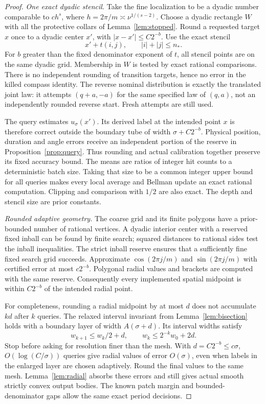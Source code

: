 \begin{proof}
\emph{One exact dyadic stencil.}
Take the fine localization to be a dyadic number comparable to $c h^s$,
where $h=2\pi/m\asymp\nu^{1/(s-2)}$. Choose a dyadic rectangle $W$
with all the protective collars of Lemma~\ref{lem:stopped}. Round a
requested target $x$ once to a dyadic center $x'$, with
$|x-x'|\le C2^{-b}$. Use the exact stencil
\[
                         x'+t(i,j),\qquad |i|+|j|\le n_*.
\]
For $b$ greater than the fixed denominator exponent of $t$, all stencil
points are on the same dyadic grid. Membership in $W$ is tested by
exact rational comparisons. There is no independent rounding of
transition targets, hence no error in the killed compass identity.
The reverse nominal distribution is exactly the translated joint law:
it attempts $(q+a,-a)$ for the same specified law of $(q,a)$, not an
independently rounded reverse start. Fresh attempts are still used.

The query estimates $u_\sigma(x')$. Its derived label at the intended
point $x$ is therefore correct outside the boundary tube of width
$\sigma+C2^{-b}$. Physical position, duration and angle errors receive
an independent portion of the reserve in
Proposition~\ref{prop:query}. Thus rounding and actual calibration
together preserve its fixed accuracy bound. The means are ratios of
integer hit counts to a deterministic batch size. Taking that size to
be a common integer upper bound for all queries makes every local
average and Bellman update an exact rational computation. Clipping and
comparison with $1/2$ are also exact. The depth and stencil size are
prior constants.

\emph{Rounded adaptive geometry.}
The coarse grid and its finite polygons have a prior-bounded number
of rational vertices. A dyadic interior center with a reserved fixed
inball can be found by finite search; squared distances to rational
sides test the inball inequalities. The strict inball reserve ensures
that a sufficiently fine fixed search grid succeeds. Approximate
$\cos(2\pi j/m)$ and $\sin(2\pi j/m)$ with certified error at most
$c2^{-b}$. Polygonal radial values and brackets are computed with the
same reserve. Consequently every implemented spatial midpoint is
within $C2^{-b}$ of the intended radial point.

For completeness, rounding a radial midpoint by at most $d$ does not
accumulate $kd$ after $k$ queries. The relaxed interval invariant from
Lemma~\ref{lem:bisection} holds with a boundary layer of width
$A(\sigma+d)$. Its interval widths satisfy
\[
                     w_{k+1}\le w_k/2+d,
 \qquad w_k\le2^{-k}w_0+2d.
\]
Stop before asking for resolution finer than the mesh. With
$d=C2^{-b}\le c\sigma$, $O(\log(C/\sigma))$ queries give radial
values of error $O(\sigma)$, even when labels in the enlarged layer
are chosen adaptively. Round the final values to the same mesh.
Lemma~\ref{lem:radial} absorbs these errors and still gives actual
smooth strictly convex output bodies. The known patch margin and
bounded-denominator gaps allow the same exact period decisions.


\end{proof}
